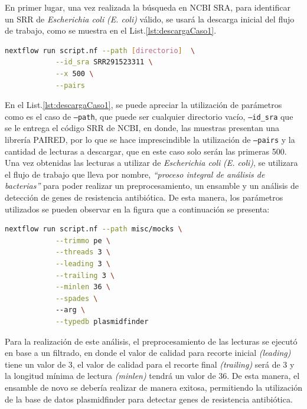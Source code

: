 \documentclass[12pt]{article}
\begin{document}
En primer lugar, una vez realizada la búsqueda en NCBI SRA, para 
identificar un SRR de \textit{Escherichia coli} \emph{(E. coli)} 
válido, se usará la descarga inicial del flujo de trabajo, 
como se muestra en el List.\ref{lst:descargaCaso1}.

\begin{center}
    \begin{lstlisting}[language=bash, caption=Comando para la descarga inicial de las muestras de \textit{Escherichia coli} \emph{(elaboración propia)}., label=lst:descargaCaso1]
        nextflow run script.nf --path [directorio]  \
            --id_sra SRR291523311 \
            --x 500 \
            --pairs
    \end{lstlisting}
\end{center}

En el List.\ref{lst:descargaCaso1}, se puede apreciar la utilización de parámetros 
como es el caso de \texttt{--path}, que puede ser cualquier directorio 
vacío, \texttt{--id\_sra} que 
se le entrega el código SRR de NCBI,  en donde, las muestras presentan una librería PAIRED, 
por lo que se hace imprescindible la utilización de \texttt{--pairs} y la cantidad de 
lecturas a 
descargar, que en este caso solo serán las primeras 500. Una vez obtenidas las lecturas a 
utilizar de  \textit{Escherichia coli} \emph{(E. coli)}, se utilizara el 
flujo de trabajo que lleva 
por nombre, \emph{“proceso integral de análisis de bacterias”} para poder realizar un 
preprocesamiento, un ensamble y un análisis de detección de genes de resistencia 
antibiótica. De esta manera, los parámetros utilizados se pueden observar en la figura 
que a continuación se presenta:

\begin{center}
    \begin{lstlisting}[language=bash, caption=Comando para la identificación de ARG de \textit{Escherichia coli} \emph{(elaboración propia)}., label=lst:ARGCaso1]
        nextflow run script.nf --path misc/mocks \
            --trimmo pe \
            --threads 3 \
            --leading 3 \
            --trailing 3 \
            --minlen 36 \
            --spades \ 
            --arg \
            --typedb plasmidfinder
    \end{lstlisting}
\end{center}

Para la realización de este análisis, el preprocesamiento de las lecturas se 
ejecutó en base a un filtrado, en donde el valor de calidad para recorte 
inicial \emph{(leading)} tiene un valor de 3, el valor de calidad para el recorte 
final \emph{(trailing)} será de 3 y  la longitud mínima de lectura \emph{(minlen)}
tendrá un valor de  36. De esta manera, el ensamble de novo se debería 
realizar de manera exitosa, permitiendo la utilización de la base de datos 
plasmidfinder para detectar genes de resistencia antibiótica.
\end{document}
